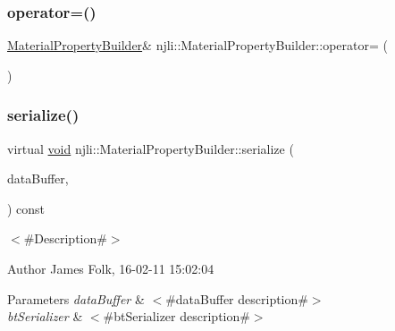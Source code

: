 \subsubsection{\texorpdfstring{operator=()}{operator=()}}
{\footnotesize\ttfamily \mbox{\hyperlink{classnjli_1_1_material_property_builder}{Material\+Property\+Builder}}\& njli\+::\+Material\+Property\+Builder\+::operator= (\begin{DoxyParamCaption}\item[{const \mbox{\hyperlink{classnjli_1_1_material_property_builder}{Material\+Property\+Builder}} \&}]{ }\end{DoxyParamCaption})\hspace{0.3cm}{\ttfamily [protected]}}

\mbox{\label{classnjli_1_1_material_property_builder_af7e20ef437aa6cc055d94a2d4ca0f917}} 
\subsubsection{\texorpdfstring{serialize()}{serialize()}}
{\footnotesize\ttfamily virtual \mbox{\hyperlink{_thread_8h_af1e856da2e658414cb2456cb6f7ebc66}{void}} njli\+::\+Material\+Property\+Builder\+::serialize (\begin{DoxyParamCaption}\item[{\mbox{\hyperlink{_thread_8h_af1e856da2e658414cb2456cb6f7ebc66}{void}} $\ast$}]{data\+Buffer,  }\item[{bt\+Serializer $\ast$}]{ }\end{DoxyParamCaption}) const\hspace{0.3cm}{\ttfamily [virtual]}}



$<$\#\+Description\#$>$ 

\begin{DoxyAuthor}{Author}
James Folk, 16-\/02-\/11 15\+:02\+:04
\end{DoxyAuthor}

\begin{DoxyParams}{Parameters}
{\em data\+Buffer} & $<$\#data\+Buffer description\#$>$ \\
\hline
{\em bt\+Serializer} & $<$\#bt\+Serializer description\#$>$ \\
\hline
\end{DoxyParams}


